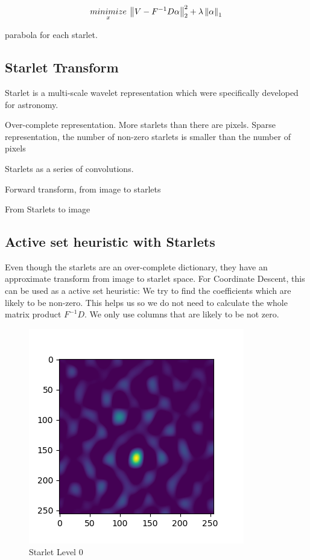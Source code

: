 \begin{equation}\label{cd:starlet}
\underset{x}{minimize} \: \left \| V - F^{-1}D\alpha \right \|_2^2 + \lambda \left \| \alpha \right \|_1 \\
\end{equation}

parabola for each starlet.






\subsection{Starlet Transform} \label{cd:starlets}
Starlet is a multi-scale wavelet representation which were specifically developed for astronomy.

Over-complete representation. More starlets than there are pixels. Sparse representation, the number of non-zero starlets is smaller than the number of pixels

Starlets as a series of convolutions.

Forward transform, from image to starlets

From Starlets to image

\subsection{Active set heuristic with Starlets}\label{cd:heuristic}
Even though the starlets are an over-complete dictionary, they have an approximate transform from image to starlet space. For Coordinate Descent, this can be used as a active set heuristic: We try to find the coefficients which are likely to be non-zero. This helps us so we do not need to calculate the whole matrix product $F^{-1}D$. We only use columns that are likely to be not zero.

\begin{figure}[h]
	\centering
	\includegraphics[width=0.5\linewidth]{./chapters/05.algorithms/sim02/starlets0.png}
	\caption{Starlet Level 0}
	\label{alg:heuristic:starlet}
\end{figure}

